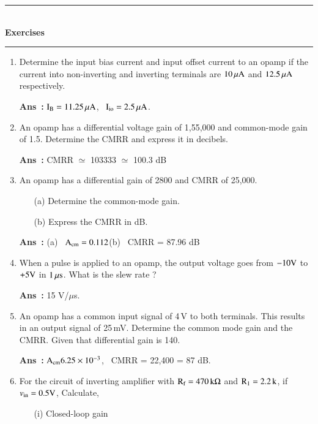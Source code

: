 \begin{center}
\rule{4cm}{1pt}\\
{\bf\Large Exercises}\\[-3pt]
\rule{4cm}{1pt}
\end{center}

\begin{enumerate}
\renewcommand{\labelenumi}{(\theenumi)}
\item Determine the input bias current and input offset current to an opamp if the current into non-inverting and inverting terminals are $10\,\mu\textrm{A}$ and $12.5\,\mu\textrm{A}$ respectively.

\smallskip
\noindent
{\bf Ans~:} $\textrm{I}_{\textrm{B}}=11.25\,\mu\textrm{A}$, \ $\textrm{I}_{\text{io}}=2.5\,\mu\textrm{A}$.

\item An opamp has a differential voltage gain of 1,55,000 and common-mode gain of 1.5. Determine the CMRR and express it in decibels.

\smallskip
\noindent
{\bf Ans~:} CMRR $\simeq$ 103333 $\simeq$ 100.3 dB

\item An opamp has a differential gain of 2800 and CMRR of 25,000.
\begin{itemize}
\item[(a)] Determine the common-mode gain.

\item[(b)] Express the CMRR in dB.
\end{itemize}

\smallskip
\noindent
{\bf Ans~:} (a)~ $\textrm{A}_{\text{cm}}=0.112$\quad (b)~ CMRR = 87.96 dB

\item When a pulse is applied to an opamp, the output voltage goes from $-10\textrm{V}$ to $+5\textrm{V}$ in $1\,\mu\textrm{s}$. What is the slew rate ?

\smallskip
\noindent
{\bf Ans~:} 15 V/$\mu$s.

\item An opamp has a common input signal of 4\,V to both terminals. This results in an output signal of 25\,mV. Determine the common mode gain and the CMRR. Given that differential gain is 140.

\smallskip
\noindent
{\bf Ans~:} $\textrm{A}_{\text{cm}}6.25\times 10^{-3}$, \ CMRR = 22,400 = 87 dB.

\item For the circuit of inverting amplifier with $\textrm{R}_{\textrm{f}}=470\,\textrm{k}\Omega$ and $\textrm{R}_{1}=2.2\,\textrm{k}$, if $v_{\text{in}}=0.5\textrm{V}$, Calculate,
\begin{itemize}
\item[(i)] Closed-loop gain


\end{itemize}
\end{enumerate}
